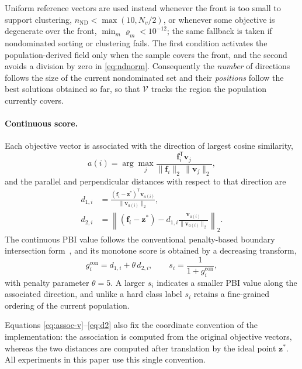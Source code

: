\documentclass[11pt,a4paper]{article}
\newcommand{\vf}{\mathbf{f}}
\newcommand{\vv}{\mathbf{v}}
\newcommand{\vz}{\mathbf{z}}
\begin{document}
Uniform reference vectors are used instead whenever the front is too small to
support clustering, $n_{\mathrm{ND}}<\max(10,N_v/2)$, or whenever some
objective is degenerate over the front,
$\min_m\varrho_m<10^{-12}$; the same fallback is taken if nondominated sorting
or clustering fails. The first condition activates the population-derived field
only when the sample covers the front, and the second avoids a division by
zero in \eqref{eq:ndnorm}. Consequently the \emph{number} of directions follows
the size of the current nondominated set and their \emph{positions} follow the
best solutions obtained so far, so that $\mathcal{V}$ tracks the region the
population currently covers.

\paragraph{Continuous score.}
Each objective vector is associated with the direction of largest cosine
similarity,
\begin{equation}
a(i)=\arg\max_{j}
\frac{\vf_i^{\mathsf T}\vv_j}{\|\vf_i\|_2\,\|\vv_j\|_2},
\label{eq:assoc-v}
\end{equation}
and the parallel and perpendicular distances with respect to that direction are
\begin{align}
d_{1,i}&=\frac{(\vf_i-\vz^{*})^{\mathsf T}\vv_{a(i)}}{\|\vv_{a(i)}\|_2},
\label{eq:d1}\\[2pt]
d_{2,i}&=\left\|(\vf_i-\vz^{*})
-d_{1,i}\frac{\vv_{a(i)}}{\|\vv_{a(i)}\|_2}\right\|_2 .
\label{eq:d2}
\end{align}
The continuous PBI value follows the conventional penalty-based boundary
intersection form~\cite{ref:moead}, and its monotone score is obtained by a
decreasing transform,
\begin{equation}
g_i^{\mathrm{con}}=d_{1,i}+\theta\,d_{2,i},
\qquad
s_i=\frac{1}{1+g_i^{\mathrm{con}}},
\label{eq:score-cont}
\end{equation}
with penalty parameter $\theta=5$. A larger $s_i$ indicates a smaller PBI value
along the associated direction, and unlike a hard class label $s_i$ retains a
fine-grained ordering of the current population.

Equations \eqref{eq:assoc-v}--\eqref{eq:d2} also fix the coordinate convention
of the implementation: the association is computed from the original objective
vectors, whereas the two distances are computed after translation by the ideal
point $\vz^{*}$. All experiments in this paper use this single convention.
\end{document}
